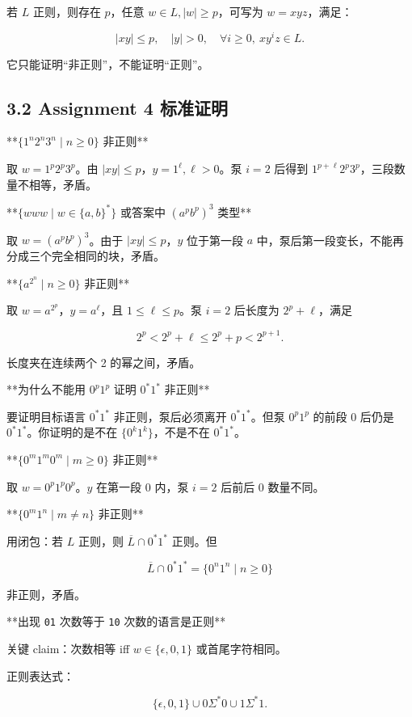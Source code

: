 ﻿\documentclass[UTF8,11pt]{ctexart}
\begin{document}
若 \(L\) 正则，则存在 \(p\)，任意 \(w\in L, |w|\ge p\)，可写为 \(w=xyz\)，满足：


\[
|xy|\le p,\quad |y|>0,\quad \forall i\ge0,\ xy^iz\in L.
\]


它只能证明“非正则”，不能证明“正则”。


\subsection{3.2 Assignment 4 标准证明}


**\(\{1^n2^n3^n\mid n\ge0\}\) 非正则**


取 \(w=1^p2^p3^p\)。由 \(|xy|\le p\)，\(y=1^\ell,\ell>0\)。泵 \(i=2\) 后得到 \(1^{p+\ell}2^p3^p\)，三段数量不相等，矛盾。


**\(\{www\mid w\in\{a,b\}^*\}\) 或答案中 \((a^pb^p)^3\) 类型**


取 \(w=(a^pb^p)^3\)。由于 \(|xy|\le p\)，\(y\) 位于第一段 \(a\) 中，泵后第一段变长，不能再分成三个完全相同的块，矛盾。


**\(\{a^{2^n}\mid n\ge0\}\) 非正则**


取 \(w=a^{2^p}\)，\(y=a^\ell\)，且 \(1\le\ell\le p\)。泵 \(i=2\) 后长度为 \(2^p+\ell\)，满足

\[
2^p<2^p+\ell\le2^p+p<2^{p+1}.
\]

长度夹在连续两个 2 的幂之间，矛盾。


**为什么不能用 \(0^p1^p\) 证明 \(0^*1^*\) 非正则**


要证明目标语言 \(0^*1^*\) 非正则，泵后必须离开 \(0^*1^*\)。但泵 \(0^p1^p\) 的前段 0 后仍是 \(0^*1^*\)。你证明的是不在 \(\{0^k1^k\}\)，不是不在 \(0^*1^*\)。


**\(\{0^m1^m0^m\mid m\ge0\}\) 非正则**


取 \(w=0^p1^p0^p\)。\(y\) 在第一段 0 内，泵 \(i=2\) 后前后 0 数量不同。


**\(\{0^m1^n\mid m\ne n\}\) 非正则**


用闭包：若 \(L\) 正则，则 \(\overline L\cap 0^*1^*\) 正则。但

\[
\overline L\cap 0^*1^*=\{0^n1^n\mid n\ge0\}
\]

非正则，矛盾。


**出现 \texttt{01} 次数等于 \texttt{10} 次数的语言是正则**


关键 claim：次数相等 iff \(w\in\{\epsilon,0,1\}\) 或首尾字符相同。  

正则表达式：

\[
\{\epsilon,0,1\}\cup0\Sigma^*0\cup1\Sigma^*1.
\]
\end{document}
